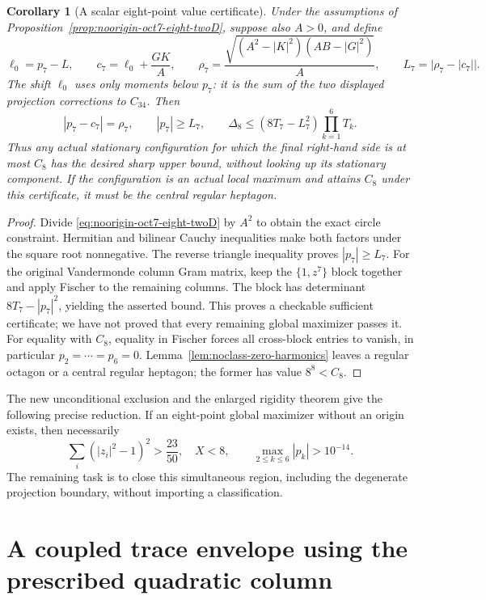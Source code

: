 \documentclass[11pt]{article}
\newtheorem{corollary}[theorem]{Corollary}
\theoremstyle{remark}
\numberwithin{equation}{section}
\begin{document}
\begin{corollary}[A scalar eight-point value certificate]
\label{cor:noorigin-oct7-eight-valuecertificate}
Under the assumptions of Proposition~\ref{prop:noorigin-oct7-eight-twoD},
suppose also $A>0$, and define
\[
 \ell_0=p_7-L,\qquad
 c_7=\ell_0+\frac{GK}{A},\qquad
 \rho_7=\frac{\sqrt{(A^2-|K|^2)(AB-|G|^2)}}{A},\qquad
 L_7=\bigl|\rho_7-|c_7|\bigr|.
\]
The shift $\ell_0$ uses only moments below $p_7$: it is the
sum of the two displayed projection corrections to $C_{34}$.
Then
\[
 |p_7-c_7|=\rho_7,\qquad |p_7|\ge L_7,
 \qquad
 \Delta_8\le(8T_7-L_7^2)\prod_{k=1}^6T_k.
\]
Thus any actual stationary configuration for which the final
right-hand side is at most $C_8$ has the desired sharp upper bound,
without looking up its stationary component.
If the configuration is an actual local maximum and attains $C_8$
under this certificate, it must be the central regular heptagon.
\end{corollary}
\begin{proof}
Divide \eqref{eq:noorigin-oct7-eight-twoD} by $A^2$ to obtain
the exact circle constraint. Hermitian and bilinear Cauchy
inequalities make both factors under the square root nonnegative.
The reverse triangle inequality proves $|p_7|\ge L_7$.
For the original Vandermonde column Gram matrix, keep the
$\{1,z^7\}$ block together and apply Fischer to the remaining
columns. The block has determinant $8T_7-|p_7|^2$, yielding
the asserted bound. This proves a checkable sufficient certificate;
we have not proved that every remaining global maximizer passes it.
For equality with $C_8$, equality in Fischer forces all cross-block
entries to vanish, in particular $p_2=\cdots=p_6=0$.
Lemma~\ref{lem:noclass-zero-harmonics} leaves a regular octagon or
a central regular heptagon; the former has value $8^8<C_8$.
\end{proof}

The new unconditional exclusion and the enlarged rigidity theorem
give the following precise reduction. If an eight-point global
maximizer without an origin exists, then necessarily
\[
 \sum_i(|z_i|^2-1)^2>\frac{23}{50},\quad X<8,\qquad
                   \max_{2\le k\le6}|p_k|>10^{-14}.
\]
The remaining task is to close this simultaneous region, including
the degenerate projection boundary, without importing a classification.

\section{A coupled trace envelope using the prescribed quadratic column}
\label{sec:noorigin-oct8-trace}
\end{document}
